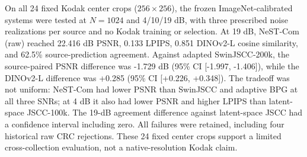 On all 24 fixed Kodak center crops ($256\times256$), the frozen ImageNet-calibrated systems were tested at $N=1024$ and 4/10/19 dB, with three prescribed noise realizations per source and no Kodak training or selection. At 19 dB, NeST-Com (raw) reached 22.416 dB PSNR, 0.133 LPIPS, 0.851 DINOv2-L cosine similarity, and 62.5\% source-prediction agreement. Against adapted SwinJSCC-200k, the source-paired PSNR difference was -1.729 dB (95\% CI [-1.997, -1.406]), while the DINOv2-L difference was +0.285 (95\% CI [+0.226, +0.348]). The tradeoff was not uniform: NeST-Com had lower PSNR than SwinJSCC and adaptive BPG at all three SNRs; at 4 dB it also had lower PSNR and higher LPIPS than latent-space JSCC-100k. The 19-dB agreement difference against latent-space JSCC had a confidence interval including zero. All failures were retained, including four historical raw CRC rejections. These 24 fixed center crops support a limited cross-collection evaluation, not a native-resolution Kodak claim.

